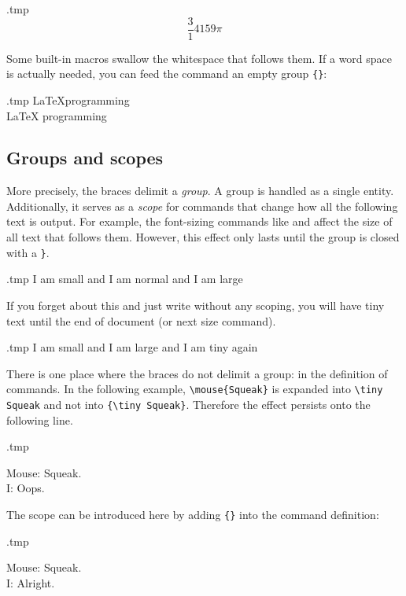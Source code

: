 \begin{VerbatimOut}{\jobname.tmp}
\newcommand{\magic}{314 159}
\[ \frac \magic \pi \]
\end{VerbatimOut}
\ShowExample

\begin{gotcha}
Some built-in macros swallow the whitespace that follows them.
If a word space is actually needed, you can feed the command an empty group \verb|{}|:
\begin{VerbatimOut}{\jobname.tmp}
\LaTeX programming\\
\LaTeX{} programming
\end{VerbatimOut}
\ShowExample
\end{gotcha}


%
\subsection{Groups and scopes}

\label{ex:font scope}
More precisely, the braces delimit a \emph{group}.
A group is handled as a single entity.
Additionally, it serves as a \emph{scope} for commands that change
how all the following text is output.
For example, the font-sizing commands like  and 
affect the size of all text that follows them.
However, this effect only lasts until the group is closed with a \verb|}|.

\begin{VerbatimOut}{\jobname.tmp}
{\tiny I am small}
and I am normal
and {\Large I am large}
\end{VerbatimOut}
\ShowExample

If you forget about this and just write  without any scoping,
you will have tiny text until the end of document (or next size command).

\begin{VerbatimOut}{\jobname.tmp}
\tiny I am small and
{\Large I am large}
and I am tiny again
\end{VerbatimOut}
\ShowExample

There is one place where the braces do not delimit a group:
in the definition of commands.
In the following example, \verb|\mouse{Squeak}| is expanded into
\verb|\tiny Squeak| and not into \verb|{\tiny Squeak}|.
Therefore the effect persists onto the following line.
%
\begin{VerbatimOut}{\jobname.tmp}
\newcommand{\mouse}[1]{Mouse: \tiny#1.}

\mouse{Squeak}\\
I: Oops.
\end{VerbatimOut}
\ShowExample
%
The scope can be introduced here by adding \verb|{}| into the command definition:
%
\begin{VerbatimOut}{\jobname.tmp}
\newcommand{\mouse}[1]{{Mouse: \tiny#1.}}

\mouse{Squeak}\\
I: Alright.
\end{VerbatimOut}
\ShowExample


